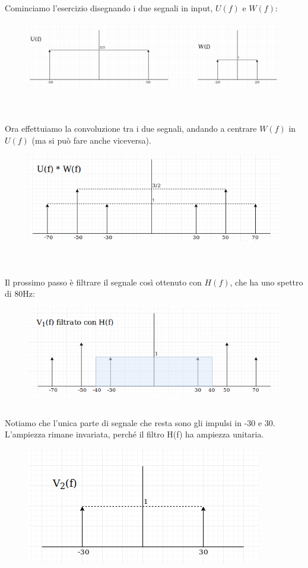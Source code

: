 \documentclass[12pt,a4paper]{article}
\begin{document}
	Cominciamo l'esercizio disegnando i due segnali in input, $U(f)$ e $W(f)$:
	\begin{figure}[h!]
		\centering
		\includegraphics[scale=0.5]{./images/fourier54_2.png}
	\end{figure}
	\\ \\Ora effettuiamo la convoluzione tra i due segnali, andando a centrare $W(f)$ in $U(f)$ (ma si può fare anche viceversa).
	\begin{figure}[h!]
		\centering
		\includegraphics[scale=0.5]{./images/fourier54_3.png}
	\end{figure}
	\\ \\Il prossimo passo è filtrare il segnale così ottenuto con $H(f)$, che ha uno spettro di 80Hz:
	\begin{figure}[h!]
		\centering
		\includegraphics[scale=0.5]{./images/fourier54_4.png}
	\end{figure}
	\\Notiamo che l'unica parte di segnale che resta sono gli impulsi in -30 e 30. L'ampiezza rimane invariata, perché il filtro H(f) ha ampiezza unitaria.
	\begin{figure}[h!]
		\centering
		\includegraphics[scale=0.5]{./images/fourier54_5.png}
	\end{figure}
\end{document}
